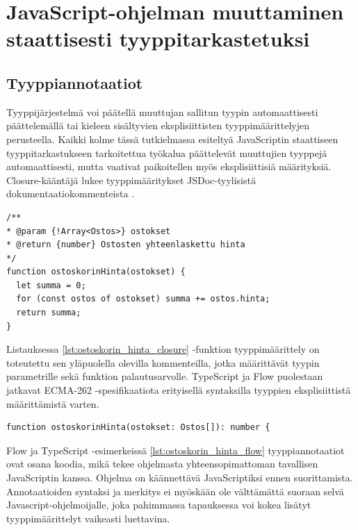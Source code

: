 \chapter{JavaScript-ohjelman muuttaminen staattisesti tyyppitarkastetuksi}

\section{Tyyppiannotaatiot}

Tyyppijärjestelmä voi päätellä muuttujan sallitun tyypin automaattisesti
päättelemällä tai kieleen sisältyvien eksplisiittisten tyyppimäärittelyjen
perusteella. Kaikki kolme tässä tutkielmassa esiteltyä JavaScriptin staattiseen
tyyppitarkastukseen tarkoitettua työkalua päättelevät muuttujien tyyppejä automaattisesti,
mutta vaativat paikoitellen myös eksplisiittisiä määrityksiä.
Closure-kääntäjä lukee
tyyppimääritykset JSDoc-tyylisistä dokumentaatiokommenteista \cite{annotatingJSforClosure}.

\begin{minipage}{\linewidth}
\begin{lstlisting}[caption={Esimerkki Closure-annotaatiosta funktiolle},label={lst:ostoskorin_hinta_closure}]
/**
* @param {!Array<Ostos>} ostokset
* @return {number} Ostosten yhteenlaskettu hinta
*/
function ostoskorinHinta(ostokset) {
  let summa = 0;
  for (const ostos of ostokset) summa += ostos.hinta;
  return summa;
}
\end{lstlisting}
\end{minipage}
Listauksessa \ref{lst:ostoskorin_hinta_closure} -funktion
tyyppimäärittely on toteutettu sen yläpuolella olevilla kommenteilla, jotka määrittävät
tyypin  parametrille sekä funktion palautusarvolle.
TypeScript ja Flow puolestaan jatkavat ECMA-262 -spesifikaatiota erityisellä syntaksilla
tyyppien eksplisiittistä määrittämistä varten. 

\begin{minipage}{\linewidth}
\begin{lstlisting}[caption={Esimerkki Flow tai TypeScript annotaatiosta funktiolle},label={lst:ostoskorin_hinta_flow}]
function ostoskorinHinta(ostokset: Ostos[]): number {
\end{lstlisting}
\end{minipage}

Flow ja TypeScript -esimerkeissä \ref{lst:ostoskorin_hinta_flow}
tyyppiannotaatiot ovat osana koodia, mikä
tekee ohjelmasta yhteensopimattoman tavallisen JavaScriptin kanssa. Ohjelma
on käännettävä JavaScriptiksi ennen suorittamista. Annotaatioiden
syntaksi ja merkitys ei myöskään ole välttämättä suoraan selvä
Javascript-ohjelmoijalle, joka pahimmassa tapauksessa voi kokea lisätyt
tyyppimäärittelyt vaikeasti luettavina. 

